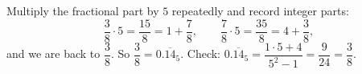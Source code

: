 Multiply the fractional part by $5$ repeatedly and record integer parts:
\[\dfrac{3}{8}\cdot5=\dfrac{15}{8}=1+\dfrac{7}{8},\qquad \dfrac{7}{8}\cdot5=\dfrac{35}{8}=4+\dfrac{3}{8},\]
and we are back to $\dfrac{3}{8}$. So $\dfrac{3}{8}=\boxed{0.\overline{14}_5}$. Check: $0.\overline{14}_5=\dfrac{1\cdot5+4}{5^2-1}=\dfrac{9}{24}=\dfrac{3}{8}$.
